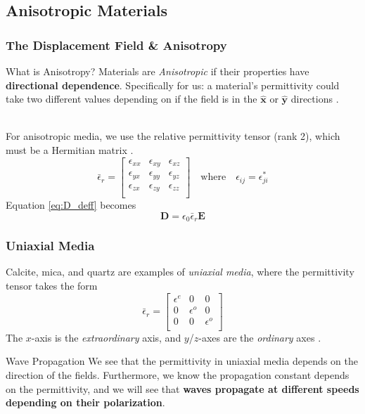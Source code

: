 \documentclass[aspectratio=169,t,xcolor=table]{beamer}
\newcommand{\bv}[1]{\mathbf{#1}}
\newcommand{\vecc}[1]{\mathbf{#1}}
\begin{document}
\subsection{Anisotropic Materials}
\begin{frame}
    \frametitle{The Displacement Field \& Anisotropy}
    \begin{alertblock}{What is Anisotropy?}
        Materials are \textit{Anisotropic} if their properties have 
        \textbf{directional
        dependence}. Specifically for us: a material's permittivity could take
        two different values depending on if the field is in the $\bv{\hat{x}}$ or
        $\bv{\hat{y}}$ directions \cite{Balanis-2012}.
    \end{alertblock}\\
    \vspace{1em}
    For anisotropic media, we use the relative permittivity tensor (rank 2), 
    which must be a Hermitian matrix \cite{CWA_S,Wav_anis}.
    \begin{equation}\label{eq:eps_ten}
        \bar{\epsilon}_r = \begin{bmatrix}
            \epsilon_{xx} & \epsilon_{xy} & \epsilon_{xz}\\
            \epsilon_{yx} & \epsilon_{yy} & \epsilon_{yz}\\
            \epsilon_{zx} & \epsilon_{zy} & \epsilon_{zz}\\
        \end{bmatrix}
        \quad\text{where}\quad
        \epsilon_{ij} = \epsilon_{ji}^*
    \end{equation}
    Equation \ref{eq:D_deff} becomes
    \begin{equation}\label{eq:D_anis}
        \vecc{D} =  \epsilon_0\bar{\epsilon}_r \vecc{E}
    \end{equation}
\end{frame}


\begin{frame}
    \frametitle{Uniaxial Media}
    Calcite, mica, and quartz are examples of \textit{uniaxial media}, where
    the permittivity tensor takes the form
    \begin{equation}\label{eq:PT_UA}
    \bar{\epsilon}_r = \begin{bmatrix}
        \epsilon^e & 0 & 0\\
        0 & \epsilon^o & 0\\
       0 & 0 & \epsilon^o\\
    \end{bmatrix}
\end{equation}
The $x$-axis is the \textit{extraordinary} axis, and $y$/$z$-axes 
are the \textit{ordinary} axes \cite{Wav_anis}.\\
\vspace{1em}
\begin{block}{Wave Propagation}
    We see that the permittivity in uniaxial media depends on the direction
    of the fields. Furthermore, we know the propagation constant depends on 
    the permittivity, and we will see that \textbf{waves propagate at different 
    speeds depending on their polarization}.
\end{block}
\end{frame}
\end{document}
